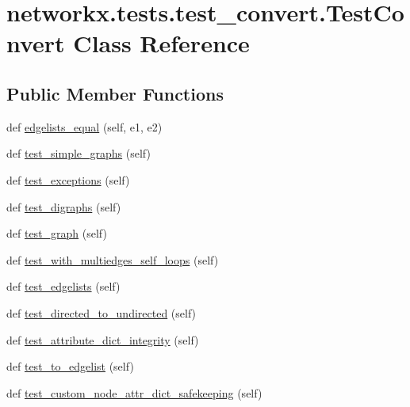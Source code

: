 \hypertarget{classnetworkx_1_1tests_1_1test__convert_1_1TestConvert}{}\section{networkx.\+tests.\+test\+\_\+convert.\+Test\+Convert Class Reference}
\label{classnetworkx_1_1tests_1_1test__convert_1_1TestConvert}
\subsection*{Public Member Functions}
\begin{DoxyCompactItemize}
\item 
def \hyperlink{classnetworkx_1_1tests_1_1test__convert_1_1TestConvert_af8e0229cc6e80ec6426c32030db7825c}{edgelists\+\_\+equal} (self, e1, e2)
\item 
def \hyperlink{classnetworkx_1_1tests_1_1test__convert_1_1TestConvert_abdbd4bec537b4f1b758aa6c2cf129e78}{test\+\_\+simple\+\_\+graphs} (self)
\item 
def \hyperlink{classnetworkx_1_1tests_1_1test__convert_1_1TestConvert_ae0f51681c42db6b6c641d8e80a970bc0}{test\+\_\+exceptions} (self)
\item 
def \hyperlink{classnetworkx_1_1tests_1_1test__convert_1_1TestConvert_a2f0f575b768114846b72173dba2a9e76}{test\+\_\+digraphs} (self)
\item 
def \hyperlink{classnetworkx_1_1tests_1_1test__convert_1_1TestConvert_a36c3ff4d62bd6d104282557ca4ddec88}{test\+\_\+graph} (self)
\item 
def \hyperlink{classnetworkx_1_1tests_1_1test__convert_1_1TestConvert_a2e41e4bc087d633a7c4de2e3b64d39b1}{test\+\_\+with\+\_\+multiedges\+\_\+self\+\_\+loops} (self)
\item 
def \hyperlink{classnetworkx_1_1tests_1_1test__convert_1_1TestConvert_aaf5871459120c8ad68c92c7ccd68c47c}{test\+\_\+edgelists} (self)
\item 
def \hyperlink{classnetworkx_1_1tests_1_1test__convert_1_1TestConvert_ae9c245277384e7d9a4e2a12b0a2558fd}{test\+\_\+directed\+\_\+to\+\_\+undirected} (self)
\item 
def \hyperlink{classnetworkx_1_1tests_1_1test__convert_1_1TestConvert_a5803042fd7ac601bb4b57845cb9f9431}{test\+\_\+attribute\+\_\+dict\+\_\+integrity} (self)
\item 
def \hyperlink{classnetworkx_1_1tests_1_1test__convert_1_1TestConvert_a0d5a6d7af0192de01fc979db879c1acf}{test\+\_\+to\+\_\+edgelist} (self)
\item 
def \hyperlink{classnetworkx_1_1tests_1_1test__convert_1_1TestConvert_a07d9d1dceaedec956b93af649989b370}{test\+\_\+custom\+\_\+node\+\_\+attr\+\_\+dict\+\_\+safekeeping} (self)
\end{DoxyCompactItemize}


